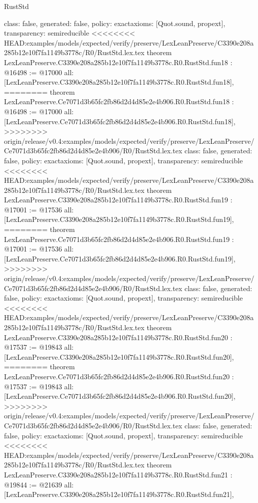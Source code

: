 \begin{lexlean}{RustStd}
\begin{coremodule}
{\begin{coremodule}
{{{{{{{{{{{{{{{{{{{{{  class: false,
  generated: false,
  policy: exact{axioms: [Quot.sound, propext]},
  transparency: semireducible
}
<<<<<<<< HEAD:examples/models/expected/verify/preserve/LexLeanPreserve/C3390e208a285b12e10f7fa1149b3778c/R0/RustStd.lex.tex
theorem LexLeanPreserve.C3390e208a285b12e10f7fa1149b3778c.R0.RustStd.fun18 : @16498 := @17000 {
  all: [LexLeanPreserve.C3390e208a285b12e10f7fa1149b3778c.R0.RustStd.fun18],
========
theorem LexLeanPreserve.Ce7071d3b65fc2fb86d2d4d85e2e4b906.R0.RustStd.fun18 : @16498 := @17000 {
  all: [LexLeanPreserve.Ce7071d3b65fc2fb86d2d4d85e2e4b906.R0.RustStd.fun18],
>>>>>>>> origin/release/v0.4:examples/models/expected/verify/preserve/LexLeanPreserve/Ce7071d3b65fc2fb86d2d4d85e2e4b906/R0/RustStd.lex.tex
  class: false,
  generated: false,
  policy: exact{axioms: [Quot.sound, propext]},
  transparency: semireducible
}
<<<<<<<< HEAD:examples/models/expected/verify/preserve/LexLeanPreserve/C3390e208a285b12e10f7fa1149b3778c/R0/RustStd.lex.tex
theorem LexLeanPreserve.C3390e208a285b12e10f7fa1149b3778c.R0.RustStd.fun19 : @17001 := @17536 {
  all: [LexLeanPreserve.C3390e208a285b12e10f7fa1149b3778c.R0.RustStd.fun19],
========
theorem LexLeanPreserve.Ce7071d3b65fc2fb86d2d4d85e2e4b906.R0.RustStd.fun19 : @17001 := @17536 {
  all: [LexLeanPreserve.Ce7071d3b65fc2fb86d2d4d85e2e4b906.R0.RustStd.fun19],
>>>>>>>> origin/release/v0.4:examples/models/expected/verify/preserve/LexLeanPreserve/Ce7071d3b65fc2fb86d2d4d85e2e4b906/R0/RustStd.lex.tex
  class: false,
  generated: false,
  policy: exact{axioms: [Quot.sound, propext]},
  transparency: semireducible
}
<<<<<<<< HEAD:examples/models/expected/verify/preserve/LexLeanPreserve/C3390e208a285b12e10f7fa1149b3778c/R0/RustStd.lex.tex
theorem LexLeanPreserve.C3390e208a285b12e10f7fa1149b3778c.R0.RustStd.fun20 : @17537 := @19843 {
  all: [LexLeanPreserve.C3390e208a285b12e10f7fa1149b3778c.R0.RustStd.fun20],
========
theorem LexLeanPreserve.Ce7071d3b65fc2fb86d2d4d85e2e4b906.R0.RustStd.fun20 : @17537 := @19843 {
  all: [LexLeanPreserve.Ce7071d3b65fc2fb86d2d4d85e2e4b906.R0.RustStd.fun20],
>>>>>>>> origin/release/v0.4:examples/models/expected/verify/preserve/LexLeanPreserve/Ce7071d3b65fc2fb86d2d4d85e2e4b906/R0/RustStd.lex.tex
  class: false,
  generated: false,
  policy: exact{axioms: [Quot.sound, propext]},
  transparency: semireducible
}
<<<<<<<< HEAD:examples/models/expected/verify/preserve/LexLeanPreserve/C3390e208a285b12e10f7fa1149b3778c/R0/RustStd.lex.tex
theorem LexLeanPreserve.C3390e208a285b12e10f7fa1149b3778c.R0.RustStd.fun21 : @19844 := @21639 {
  all: [LexLeanPreserve.C3390e208a285b12e10f7fa1149b3778c.R0.RustStd.fun21],
}}}}}}}}}}}}}}}}}}}}}}}}
\end{coremodule}}
\end{coremodule}
\end{lexlean}
